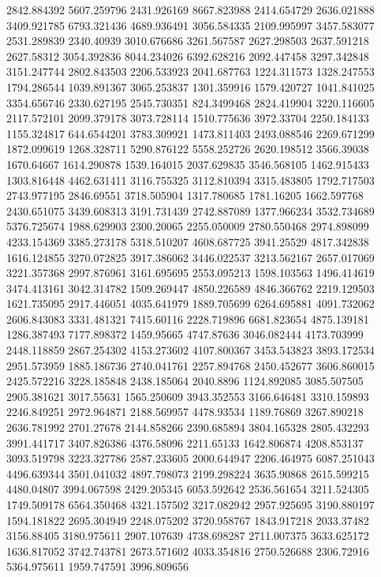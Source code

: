2842.884392
5607.259796
2431.926169
8667.823988
2414.654729
2636.021888
3409.921785
6793.321436
4689.936491
3056.584335
2109.995997
3457.583077
2531.289839
2340.40939
3010.676686
3261.567587
2627.298503
2637.591218
2627.58312
3054.392836
8044.234026
6392.628216
2092.447458
3297.342848
3151.247744
2802.843503
2206.533923
2041.687763
1224.311573
1328.247553
1794.286544
1039.891367
3065.253837
1301.359916
1579.420727
1041.841025
3354.656746
2330.627195
2545.730351
824.3499468
2824.419904
3220.116605
2117.572101
2099.379178
3073.728114
1510.775636
3972.33704
2250.184133
1155.324817
644.6544201
3783.309921
1473.811403
2493.088546
2269.671299
1872.099619
1268.328711
5290.876122
5558.252726
2620.198512
3566.39038
1670.64667
1614.290878
1539.164015
2037.629835
3546.568105
1462.915433
1303.816448
4462.631411
3116.755325
3112.810394
3315.483805
1792.717503
2743.977195
2846.69551
3718.505904
1317.780685
1781.16205
1662.597768
2430.651075
3439.608313
3191.731439
2742.887089
1377.966234
3532.734689
5376.725674
1988.629903
2300.20065
2255.050009
2780.550468
2974.898099
4233.154369
3385.273178
5318.510207
4608.687725
3941.25529
4817.342838
1616.124855
3270.072825
3917.386062
3446.022537
3213.562167
2657.017069
3221.357368
2997.876961
3161.695695
2553.095213
1598.103563
1496.414619
3474.413161
3042.314782
1509.269447
4850.226589
4846.366762
2219.129503
1621.735095
2917.446051
4035.641979
1889.705699
6264.695881
4091.732062
2606.843083
3331.481321
7415.60116
2228.719896
6681.823654
4875.139181
1286.387493
7177.898372
1459.95665
4747.87636
3046.082444
4173.703999
2448.118859
2867.254302
4153.273602
4107.800367
3453.543823
3893.172534
2951.573959
1885.186736
2740.041761
2257.894768
2450.452677
3606.860015
2425.572216
3228.185848
2438.185064
2040.8896
1124.892085
3085.507505
2905.381621
3017.55631
1565.250609
3943.352553
3166.646481
3310.159893
2246.849251
2972.964871
2188.569957
4478.93534
1189.76869
3267.890218
2636.781992
2701.27678
2144.858266
2390.685894
3804.165328
2805.432293
3991.441717
3407.826386
4376.58096
2211.65133
1642.806874
4208.853137
3093.519798
3223.327786
2587.233605
2000.644947
2206.464975
6087.251043
4496.639344
3501.041032
4897.798073
2199.298224
3635.90868
2615.599215
4480.04807
3994.067598
2429.205345
6053.592642
2536.561654
3211.524305
1749.509178
6564.350468
4321.157502
3217.082942
2957.925695
3190.880197
1594.181822
2695.304949
2248.075202
3720.958767
1843.917218
2033.37482
3156.88405
3180.975611
2907.107639
4738.698287
2711.007375
3633.625172
1636.817052
3742.743781
2673.571602
4033.354816
2750.526688
2306.72916
5364.975611
1959.747591
3996.809656
